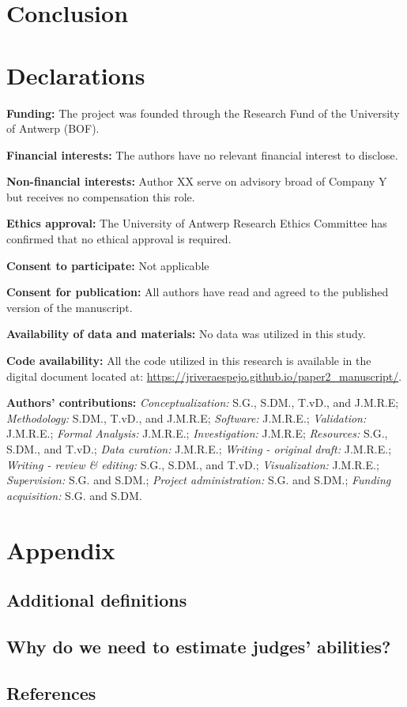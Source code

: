 \documentclass[
  authoryear,
  preprint,
  1p]{elsarticle}
\begin{document}
\section{Conclusion}\label{sec-conclusion}

\newpage{}

\section*{Declarations}\label{declarations}

\textbf{Funding:} The project was founded through the Research Fund of
the University of Antwerp (BOF).

\textbf{Financial interests:} The authors have no relevant financial
interest to disclose.

\textbf{Non-financial interests:} Author XX serve on advisory broad of
Company Y but receives no compensation this role.

\textbf{Ethics approval:} The University of Antwerp Research Ethics
Committee has confirmed that no ethical approval is required.

\textbf{Consent to participate:} Not applicable

\textbf{Consent for publication:} All authors have read and agreed to
the published version of the manuscript.

\textbf{Availability of data and materials:} No data was utilized in
this study.

\textbf{Code availability:} All the code utilized in this research is
available in the digital document located at:
\url{https://jriveraespejo.github.io/paper2_manuscript/}.

\textbf{Authors' contributions:} \emph{Conceptualization:} S.G., S.DM.,
T.vD., and J.M.R.E; \emph{Methodology:} S.DM., T.vD., and J.M.R.E;
\emph{Software:} J.M.R.E.; \emph{Validation:} J.M.R.E.; \emph{Formal
Analysis:} J.M.R.E.; \emph{Investigation:} J.M.R.E; \emph{Resources:}
S.G., S.DM., and T.vD.; \emph{Data curation:} J.M.R.E.; \emph{Writing -
original draft:} J.M.R.E.; \emph{Writing - review \& editing:} S.G.,
S.DM., and T.vD.; \emph{Visualization:} J.M.R.E.; \emph{Supervision:}
S.G. and S.DM.; \emph{Project administration:} S.G. and S.DM.;
\emph{Funding acquisition:} S.G. and S.DM.

\newpage{}

\section{Appendix}\label{sec-appendix}

\subsection{Additional definitions}\label{sec-appA}

\subsection{Why do we need to estimate judges'
abilities?}\label{sec-appB}

\newpage{}

\subsection*{References}\label{references}

\renewcommand{\bibsection}{}

\end{document}
